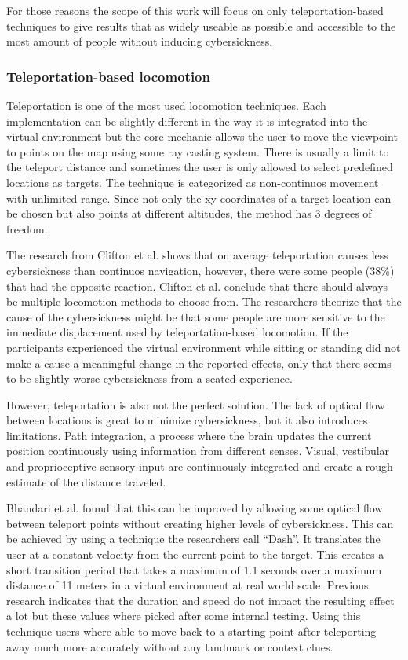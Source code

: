 For those reasons the scope of this work will focus on only
teleportation-based techniques to give results that as widely useable as
possible and accessible to the most amount of people without inducing
cybersickness.

\subsubsection{Teleportation-based locomotion}\label{teleportation-based-locomotion}

Teleportation is one of the most used locomotion techniques. Each
implementation can be slightly different in the way it is integrated
into the virtual environment but the core mechanic allows the user to
move the viewpoint to points on the map using some ray casting system.
There is usually a limit to the teleport distance and sometimes the user
is only allowed to select predefined locations as targets. The technique
is categorized as non-continuos movement with unlimited range. Since not
only the xy coordinates of a target location can be chosen but also
points at different altitudes, the method has 3 degrees of freedom.

The research from Clifton et al. \cite{Clifton} shows that on average teleportation
causes less cybersickness than continuos navigation, however, there were
some people (38\%) that had the opposite reaction.
Clifton et al. conclude that there should always be multiple locomotion
methods to choose from. The researchers theorize that the cause of the
cybersickness might be that some people are more sensitive to the
immediate displacement used by teleportation-based locomotion. If the
participants experienced the virtual environment while sitting or
standing did not make a cause a meaningful change in the reported
effects, only that there seems to be slightly worse cybersickness from a
seated experience. 

However, teleportation is also not the perfect solution. 
The lack of optical flow between locations is great to minimize
cybersickness, but it also introduces limitations. 
Path integration, a process where the brain updates the current position
continuously using information from different senses. Visual, vestibular
and proprioceptive sensory input are continuously integrated and create
a rough estimate of the distance traveled. \cite{Bhandari}

Bhandari et al. \cite{Bhandari} found that this can be improved by allowing some optical
flow between teleport points without creating higher levels of
cybersickness. This can be achieved by using a technique the researchers
call ``Dash''. It translates the user at a constant velocity from the
current point to the target. This creates a short transition period that
takes a maximum of 1.1 seconds over a maximum distance of 11 meters in a
virtual environment at real world scale. Previous research indicates
that the duration and speed do not impact the resulting effect a lot
\cite{Bowman} but these values where picked after some
internal testing. Using this technique users where able to move back to
a starting point after teleporting away much more accurately without any
landmark or context clues. 

